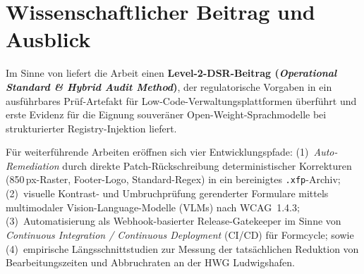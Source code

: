 \section{Wissenschaftlicher Beitrag und Ausblick}
\label{sec:wissenschaftlicher_beitrag}

Im Sinne von \textcite{gregor2013positioning} liefert die Arbeit einen \textbf{Level-2-DSR-Beitrag (\textit{Operational Standard \& Hybrid Audit Method})}, der regulatorische Vorgaben in ein ausführbares Prüf-Artefakt für Low-Code-Verwaltungsplattformen überführt und erste Evidenz für die Eignung souveräner Open-Weight-Sprachmodelle bei strukturierter Registry-Injektion liefert.

Für weiterführende Arbeiten eröffnen sich vier Entwicklungspfade: (1)~\textit{Auto-Remediation} durch direkte Patch-Rückschreibung deterministischer Korrekturen (850\,px-Raster, Footer-Logo, Standard-Regex) in ein bereinigtes \texttt{.xfp}-Archiv; (2)~visuelle Kontrast- und Umbruchprüfung gerenderter Formulare mittels multimodaler Vision-Language-Modelle (VLMs) nach WCAG~1.4.3; (3)~Automatisierung als Webhook-basierter Release-Gatekeeper im Sinne von \textit{Continuous Integration / Continuous Deployment} (CI/CD) für Formcycle; sowie (4)~empirische Längsschnittstudien zur Messung der tatsächlichen Reduktion von Bearbeitungszeiten und Abbruchraten an der HWG Ludwigshafen.
